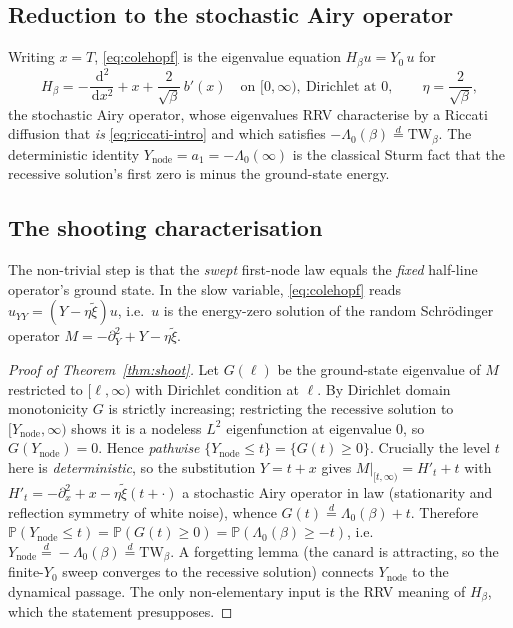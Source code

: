 \documentclass[11pt,reqno]{amsart}
\theoremstyle{plain}
\theoremstyle{definition}
\theoremstyle{remark}
\newcommand{\dd}{\,\mathrm{d}}
\newcommand{\eqd}{\stackrel{d}{=}}
\newcommand{\TW}{\mathrm{TW}}
\newcommand{\Ynode}{Y_{\mathrm{node}}}
\newcommand{\Lam}{\Lambda_0}
\begin{document}
\subsection{Reduction to the stochastic Airy operator}
Writing $x=T$, \eqref{eq:colehopf} is the eigenvalue equation $H_\beta u=Y_0\,u$ for
\begin{equation}\label{eq:sao}
  H_\beta=-\frac{\dd^2}{\dd x^2}+x+\frac{2}{\sqrt\beta}\,b'(x)\quad\text{on }[0,\infty),\
  \text{Dirichlet at }0,\qquad \eta=\frac{2}{\sqrt\beta},
\end{equation}
the stochastic Airy operator, whose eigenvalues RRV \cite{RRV} characterise by a Riccati
diffusion that \emph{is} \eqref{eq:riccati-intro} and which satisfies $-\Lam(\beta)\eqd
\TW_\beta$. The deterministic identity $\Ynode=a_1=-\Lam(\infty)$ is the classical Sturm
fact that the recessive solution's first zero is minus the ground-state energy.

\subsection{The shooting characterisation}
The non-trivial step is that the \emph{swept} first-node law equals the \emph{fixed}
half-line operator's ground state. In the slow variable, \eqref{eq:colehopf} reads
$u_{YY}=(Y-\eta\tilde\xi)u$, i.e.\ $u$ is the energy-zero solution of the random
Schr\"odinger operator $M=-\partial_Y^2+Y-\eta\tilde\xi$.

\begin{proof}[Proof of Theorem~\ref{thm:shoot}]
Let $G(\ell)$ be the ground-state eigenvalue of $M$ restricted to $[\ell,\infty)$ with
Dirichlet condition at $\ell$. By Dirichlet domain monotonicity $G$ is strictly increasing;
restricting the recessive solution to $[\Ynode,\infty)$ shows it is a nodeless $L^2$
eigenfunction at eigenvalue $0$, so $G(\Ynode)=0$. Hence \emph{pathwise}
$\{\Ynode\le t\}=\{G(t)\ge0\}$. Crucially the level $t$ here is \emph{deterministic}, so the
substitution $Y=t+x$ gives $M|_{[t,\infty)}=H'_t+t$ with $H'_t=-\partial_x^2+x-\eta\tilde
\xi(t+\cdot)$ a stochastic Airy operator in law (stationarity and reflection symmetry of
white noise), whence $G(t)\eqd\Lam(\beta)+t$. Therefore
$\mathbb P(\Ynode\le t)=\mathbb P(G(t)\ge0)=\mathbb P(\Lam(\beta)\ge-t)$, i.e.\
$\Ynode\eqd-\Lam(\beta)\eqd\TW_\beta$. A forgetting lemma (the canard is attracting, so the
finite-$Y_0$ sweep converges to the recessive solution) connects $\Ynode$ to the dynamical
passage. The only non-elementary input is the RRV meaning of $H_\beta$, which the statement
presupposes.
\end{proof}
\end{document}
